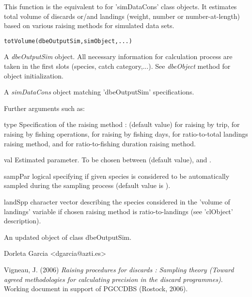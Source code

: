 \begin{Description}\relax
This function is the equivalent to  for 'simDataCons' class objects. It estimates total volume of discards or/and 
landings (weight, number or number-at-length) based on various raising methods for simulated data sets.
\end{Description}
\begin{Usage}
\begin{verbatim}
totVolume(dbeOutputSim,simObject,...)
\end{verbatim}
\end{Usage}
\begin{Arguments}
\begin{ldescription}
\item[\code{dbeOutputSim}] A \emph{dbeOutputSim} object. All necessary information for calculation process are taken in the first slots (species, catch category,...). See \emph{dbeObject} method for object initialization.
\item[\code{simObject}] A \emph{simDataCons} object matching 'dbeOutputSim' specifications.
\item[\code{...}] Further arguments such as:
\item[type] Specification of the raising method :  (default value) for raising by trip,  for raising by fishing operations, 
 for raising by fishing days, for ratio-to-total landings raising method, and  for ratio-to-fishing duration 
raising method.
\item[val] Estimated parameter. To be chosen between  (default value),  and .
\item[sampPar] logical specifying if given species is considered to be automatically sampled during the sampling process (default value is ).
\item[landSpp] character vector describing the species considered in the 'volume of landings' variable if chosen raising method is ratio-to-landings (see 'clObject' description).  

\end{ldescription}
\end{Arguments}
\begin{Value}
An updated object of class dbeOutputSim.
\end{Value}
\begin{Author}\relax
Dorleta Garcia <dgarcia@azti.es>
\end{Author}
\begin{References}\relax
Vigneau, J. (2006)          
\emph{Raising procedures for discards : Sampling theory (Toward agreed methodologies for calculating precision in the discard programmes)}. Working document in support of PGCCDBS (Rostock, 2006).
\end{References}
\begin{SeeAlso}\relax
{}
\end{SeeAlso}


